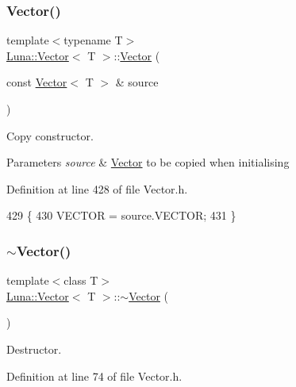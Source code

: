 \subsubsection{\texorpdfstring{Vector()}{Vector()}\hspace{0.1cm}{\footnotesize\ttfamily [5/5]}}
{\footnotesize\ttfamily template$<$typename T$>$ \\
\hyperlink{classLuna_1_1Vector}{Luna\+::\+Vector}$<$ T $>$\+::\hyperlink{classLuna_1_1Vector}{Vector} (\begin{DoxyParamCaption}\item[{const \hyperlink{classLuna_1_1Vector}{Vector}$<$ T $>$ \&}]{source }\end{DoxyParamCaption})\hspace{0.3cm}{\ttfamily [inline]}}



Copy constructor. 


\begin{DoxyParams}{Parameters}
{\em source} & \hyperlink{classLuna_1_1Vector}{Vector} to be copied when initialising \\
\hline
\end{DoxyParams}


Definition at line 428 of file Vector.\+h.


\begin{DoxyCode}
429   \{
430     VECTOR = source.VECTOR;
431   \}
\end{DoxyCode}
\mbox{\label{classLuna_1_1Vector_ab2453cc67935af9a0dd0b86292bd47d8}} 
\subsubsection{\texorpdfstring{$\sim$\+Vector()}{~Vector()}}
{\footnotesize\ttfamily template$<$class T$>$ \\
\hyperlink{classLuna_1_1Vector}{Luna\+::\+Vector}$<$ T $>$\+::$\sim$\hyperlink{classLuna_1_1Vector}{Vector} (\begin{DoxyParamCaption}{ }\end{DoxyParamCaption})\hspace{0.3cm}{\ttfamily [inline]}}



Destructor. 



Definition at line 74 of file Vector.\+h.



